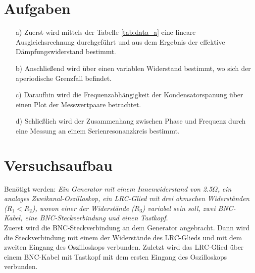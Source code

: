 
\section{Aufgaben}\justifying

 \begin{enumerate}

    \item[a)] \justifying Zuerst wird mittels der Tabelle \ref{tab:data_a} eine lineare
                          Ausgleichsrechnung durchgeführt und aus dem Ergebnis der effektive
                          Dämpfungswiderstand bestimmt.

    \item[b)] \justifying Anschließend wird über einen variablen Widerstand bestimmt,
                          wo sich der aperiodische Grenzfall befindet. 
  
    \item[c)] \justifying Daraufhin wird die Frequenzabhängigkeit
                          der Kondensatorspanung über einen Plot der Messwertpaare
                          betrachtet.
  
    \item[d)] \justifying Schließlich wird der Zusammenhang zwischen Phase und Frequenz
                          durch eine Messung an einem Serienresonanzkreis bestimmt.
    
  \end{enumerate}


\section{Versuchsaufbau}\justifying
Benötigt werden: \textit{Ein Generator mit einem Innenwiderstand von 2.5$\Omega$, 
ein analoges Zweikanal-Oszilloskop, ein LRC-Glied mit drei ohmschen Widerständen 
($R_1 < R_2$), wovon einer der Widerstände ($R_3$) variabel sein soll, 
zwei BNC-Kabel, eine BNC-Steckverbindung und einen Tastkopf}.\\
Zuerst wird die BNC-Steckverbindung an dem Generator angebracht. 
Dann wird die Steckverbindung mit einem der Widerstände des LRC-Glieds und mit dem zweiten 
Eingang des Oszilloskops verbunden.
Zuletzt wird das LRC-Glied über einem BNC-Kabel mit Tastkopf 
mit dem ersten Eingang des Oszilloskops verbunden.

